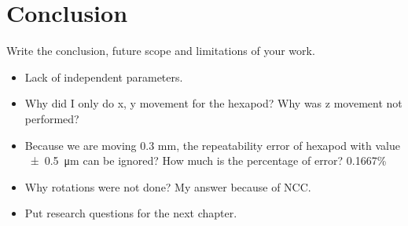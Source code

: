 \chapter{Conclusion}

Write the conclusion, future scope and limitations of your work.


\begin{itemize}
    \item Lack of independent parameters.
    \item Why did I only do x, y movement for the hexapod? Why was z movement not performed?
    \item Because we are moving 0.3 mm, the repeatability error of hexapod with value \SI{\pm0.5}{\micro\meter} can be ignored? How much is the percentage of error? 0.1667\%
    \item Why rotations were not done? My answer because of NCC.
    \item Put research questions for the next chapter.
\end{itemize}